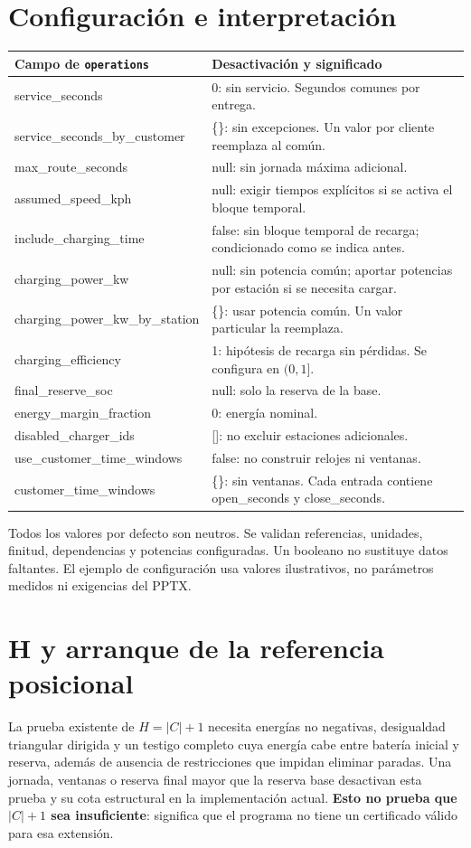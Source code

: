 \documentclass[11pt,a4paper]{article}
\newcommand{\code}[1]{\texttt{\small #1}}
\begin{document}
\section{Configuración e interpretación}
\small
\begin{tabularx}{\textwidth}{@{}>{\ttfamily}l X@{}}
\toprule
\normalfont Campo de \code{operations} & Desactivación y significado\\\midrule
service\_seconds & 0: sin servicio. Segundos comunes por entrega.\\
service\_seconds\_by\_customer & \{\}: sin excepciones. Un valor por cliente reemplaza al común.\\
max\_route\_seconds & null: sin jornada máxima adicional.\\
assumed\_speed\_kph & null: exigir tiempos explícitos si se activa el bloque temporal.\\
include\_charging\_time & false: sin bloque temporal de recarga; condicionado como se indica antes.\\
charging\_power\_kw & null: sin potencia común; aportar potencias por estación si se necesita cargar.\\
charging\_power\_kw\_by\_station & \{\}: usar potencia común. Un valor particular la reemplaza.\\
charging\_efficiency & 1: hipótesis de recarga sin pérdidas. Se configura en $(0,1]$.\\
final\_reserve\_soc & null: solo la reserva de la base.\\
energy\_margin\_fraction & 0: energía nominal.\\
disabled\_charger\_ids & []: no excluir estaciones adicionales.\\
use\_customer\_time\_windows & false: no construir relojes ni ventanas.\\
customer\_time\_windows & \{\}: sin ventanas. Cada entrada contiene open\_seconds y close\_seconds.\\
\bottomrule
\end{tabularx}
\normalsize

Todos los valores por defecto son neutros. Se validan referencias, unidades,
finitud, dependencias y potencias configuradas. Un booleano no sustituye datos
faltantes. El ejemplo de configuración usa valores ilustrativos, no parámetros
medidos ni exigencias del PPTX.

\section{H y arranque de la referencia posicional}
La prueba existente de $H=|C|+1$ necesita energías no negativas, desigualdad
triangular dirigida y un testigo completo cuya energía cabe entre batería
inicial y reserva, además de ausencia de restricciones que impidan eliminar
paradas. Una jornada, ventanas o reserva final mayor que la reserva base
desactivan esta prueba y su cota estructural en la implementación actual.
\textbf{Esto no prueba que $|C|+1$ sea insuficiente}: significa que el programa
no tiene un certificado válido para esa extensión.
\end{document}
